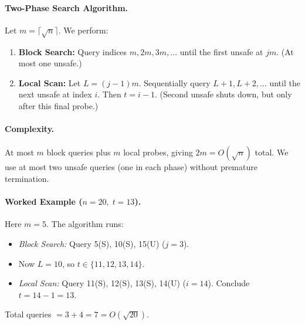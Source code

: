 \documentclass[12pt]{article}
\begin{document}
	\paragraph{Two-Phase Search Algorithm.}
	Let $m = \lceil\sqrt{n}\rceil$.  We perform:
	\begin{enumerate}
		\item \textbf{Block Search:} Query indices $m,2m,3m,\dots$ until the first unsafe at $jm$.  (At most one unsafe.)
		\item \textbf{Local Scan:} Let $L=(j-1)m$.  Sequentially query $L+1, L+2,\dots$ until the next unsafe at index $i$.  Then $t=i-1$.  (Second unsafe shuts down, but only after this final probe.)
	\end{enumerate}
	
	\paragraph{Complexity.}
	At most $m$ block queries plus $m$ local probes, giving $2m=O(\sqrt{n})$ total.  We use at most two unsafe queries (one in each phase) without premature termination.
	
	\paragraph{Worked Example ($n=20,\;t=13$).}
	Here $m=5$.  The algorithm runs:
	\begin{itemize}
		\item \emph{Block Search:} Query 5(S), 10(S), 15(U) \quad($j=3$).
		\item Now $L=10$, so $t\in\{11,12,13,14\}$.
		\item \emph{Local Scan:} Query 11(S), 12(S), 13(S), 14(U) \quad($i=14$). Conclude $t=14-1=13$.
	\end{itemize}
	Total queries $=3+4=7=O(\sqrt{20})$.
	
\end{document}
